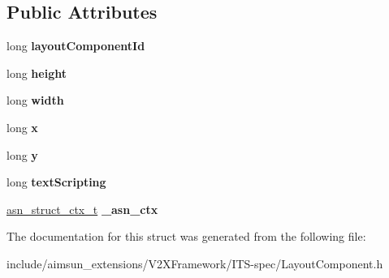 \subsection*{Public Attributes}
\begin{DoxyCompactItemize}
\item 
long {\bfseries layout\+Component\+Id}\hypertarget{structLayoutComponent_ae8b2cf42959cd641025b83f59ea73f8a}{}\label{structLayoutComponent_ae8b2cf42959cd641025b83f59ea73f8a}

\item 
long {\bfseries height}\hypertarget{structLayoutComponent_a751a03e469931adcb5d2857eeeeb121c}{}\label{structLayoutComponent_a751a03e469931adcb5d2857eeeeb121c}

\item 
long {\bfseries width}\hypertarget{structLayoutComponent_a33591e9ff4dffbf2506c69991c68de49}{}\label{structLayoutComponent_a33591e9ff4dffbf2506c69991c68de49}

\item 
long {\bfseries x}\hypertarget{structLayoutComponent_a53f3187b2ba8c41c971246f7151de912}{}\label{structLayoutComponent_a53f3187b2ba8c41c971246f7151de912}

\item 
long {\bfseries y}\hypertarget{structLayoutComponent_a848db7165bb3a461bcd200ecb48e5bb2}{}\label{structLayoutComponent_a848db7165bb3a461bcd200ecb48e5bb2}

\item 
long {\bfseries text\+Scripting}\hypertarget{structLayoutComponent_afe4e6963a6d0a58fef307b807937bf8b}{}\label{structLayoutComponent_afe4e6963a6d0a58fef307b807937bf8b}

\item 
\hyperlink{structasn__struct__ctx__s}{asn\+\_\+struct\+\_\+ctx\+\_\+t} {\bfseries \+\_\+asn\+\_\+ctx}\hypertarget{structLayoutComponent_aec02cd61bc954352fe39e46721e6b072}{}\label{structLayoutComponent_aec02cd61bc954352fe39e46721e6b072}

\end{DoxyCompactItemize}


The documentation for this struct was generated from the following file\+:\begin{DoxyCompactItemize}
\item 
include/aimsun\+\_\+extensions/\+V2\+X\+Framework/\+I\+T\+S-\/spec/Layout\+Component.\+h\end{DoxyCompactItemize}
